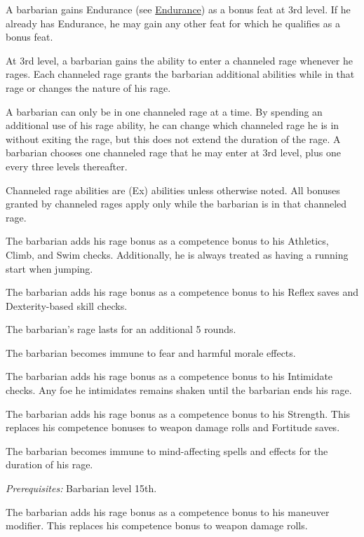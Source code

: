  A barbarian gains Endurance (see \hyperlink{feat:Endurance}{Endurance}) as a bonus feat at 3rd level. If he already has Endurance, he may gain any other feat for which he qualifies as a bonus feat.

 At 3rd level, a barbarian gains the ability to enter a channeled rage whenever he rages. Each channeled rage grants the barbarian additional abilities while in that rage or changes the nature of his rage.
\par A barbarian can only be in one channeled rage at a time. By spending an additional use of his rage ability, he can change which channeled rage he is in without exiting the rage, but this does not extend the duration of the rage. A barbarian chooses one channeled rage that he may enter at 3rd level, plus one every three levels thereafter.
\par Channeled rage abilities are (Ex) abilities unless otherwise noted. All bonuses granted by channeled rages apply only while the barbarian is in that channeled rage.

 The barbarian adds his rage bonus as a competence bonus to his Athletics, Climb, and Swim checks. Additionally, he is always treated as having a running start when jumping.

 The barbarian adds his rage bonus as a competence bonus to his Reflex saves and Dexterity-based skill checks.

 The barbarian's rage lasts for an additional 5 rounds.

 The barbarian becomes immune to fear and harmful morale effects.

 The barbarian adds his rage bonus as a competence bonus to his Intimidate checks. Any foe he intimidates remains shaken until the barbarian ends his rage.

 The barbarian adds his rage bonus as a competence bonus to his Strength. This replaces his competence bonuses to weapon damage rolls and Fortitude saves.

 The barbarian becomes immune to mind-affecting spells and effects for the duration of his rage.

\textit{Prerequisites:} Barbarian level 15th.

 The barbarian adds his rage bonus as a competence bonus to his maneuver modifier. This replaces his competence bonus to weapon damage rolls.

